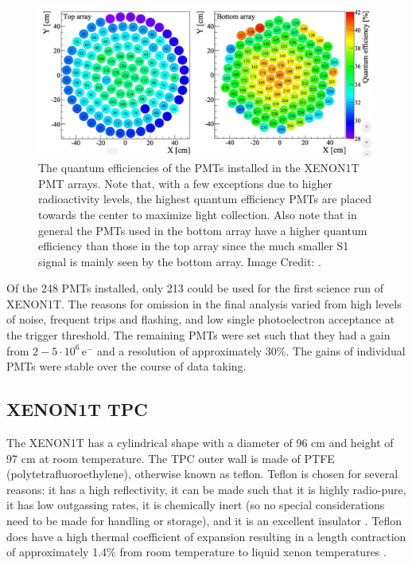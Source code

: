 \begin{figure}[t]
	\centering
	\includegraphics[width=0.99\textwidth]{xe1t_pmt_qe}
	\caption{The quantum efficiencies of the PMTs installed in the XENON1T PMT arrays.  Note that, with a few exceptions due to higher radioactivity levels, the highest quantum efficiency PMTs are placed towards the center to maximize light collection.  Also note that in general the PMTs used in the bottom array have a higher quantum efficiency than those in the top array since the much smaller S1 signal is mainly seen by the bottom array.  Image Credit: .}
	\label{fig:xe1t_pmt_qe}
\end{figure}
 
 Of the 248 PMTs installed, only 213 could be used for the first science run of XENON1T.  The reasons for omission in the final analysis varied from high levels of noise, frequent trips and flashing, and low single photoelectron acceptance at the trigger threshold.  The remaining PMTs were set such that they had a gain from $2- 5 \cdot 10^6 \, \textrm{e}^-$ and a resolution of approximately 30\%.  The gains of individual PMTs were stable over the course of data taking.
 
 
  \subsection{XENON1T TPC}
 \label{sec:xe1t_tpc}

The XENON1T has a cylindrical shape with a diameter of 96 cm and height of 97 cm at room temperature.  The TPC outer wall is made of PTFE (polytetrafluoroethylene), otherwise known as teflon.  Teflon is chosen for several reasons: it has a high reflectivity, it can be made such that it is highly radio-pure, it has low outgassing rates, it is chemically inert (so no special considerations need to be made for handling or storage), and it is an excellent insulator \cite{neves2017measurement}.  Teflon does have a high thermal coefficient of expansion resulting in a length contraction of approximately 1.4\% from room temperature to liquid xenon temperatures \cite{kirby1956thermal}.


